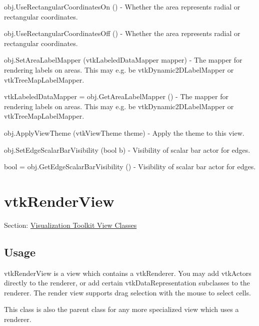 \begin{DoxyItemize}
\item {\ttfamily obj.\-Use\-Rectangular\-Coordinates\-On ()} -\/ Whether the area represents radial or rectangular coordinates.  
\item {\ttfamily obj.\-Use\-Rectangular\-Coordinates\-Off ()} -\/ Whether the area represents radial or rectangular coordinates.  
\item {\ttfamily obj.\-Set\-Area\-Label\-Mapper (vtk\-Labeled\-Data\-Mapper mapper)} -\/ The mapper for rendering labels on areas. This may e.\-g. be vtk\-Dynamic2\-D\-Label\-Mapper or vtk\-Tree\-Map\-Label\-Mapper.  
\item {\ttfamily vtk\-Labeled\-Data\-Mapper = obj.\-Get\-Area\-Label\-Mapper ()} -\/ The mapper for rendering labels on areas. This may e.\-g. be vtk\-Dynamic2\-D\-Label\-Mapper or vtk\-Tree\-Map\-Label\-Mapper.  
\item {\ttfamily obj.\-Apply\-View\-Theme (vtk\-View\-Theme theme)} -\/ Apply the theme to this view.  
\item {\ttfamily obj.\-Set\-Edge\-Scalar\-Bar\-Visibility (bool b)} -\/ Visibility of scalar bar actor for edges.  
\item {\ttfamily bool = obj.\-Get\-Edge\-Scalar\-Bar\-Visibility ()} -\/ Visibility of scalar bar actor for edges.  
\end{DoxyItemize}\hypertarget{vtkviews_vtkrenderview}{}\section{vtk\-Render\-View}\label{vtkviews_vtkrenderview}
Section\-: \hyperlink{sec_vtkviews}{Visualization Toolkit View Classes} \hypertarget{vtkwidgets_vtkxyplotwidget_Usage}{}\subsection{Usage}\label{vtkwidgets_vtkxyplotwidget_Usage}
vtk\-Render\-View is a view which contains a vtk\-Renderer. You may add vtk\-Actors directly to the renderer, or add certain vtk\-Data\-Representation subclasses to the renderer. The render view supports drag selection with the mouse to select cells.

This class is also the parent class for any more specialized view which uses a renderer.

